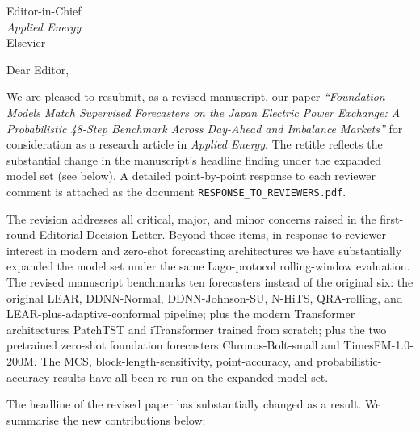 \documentclass[11pt,a4paper]{letter}
\begin{document}
\begin{letter}{Editor-in-Chief \\ \emph{Applied Energy} \\ Elsevier}

\opening{Dear Editor,}

We are pleased to resubmit, as a revised manuscript, our paper \emph{``Foundation Models Match Supervised Forecasters on the Japan Electric Power Exchange: A Probabilistic 48-Step Benchmark Across Day-Ahead and Imbalance Markets''} for consideration as a research article in \emph{Applied Energy}. The retitle reflects the substantial change in the manuscript's headline finding under the expanded model set (see below). A detailed point-by-point response to each reviewer comment is attached as the document \texttt{RESPONSE\_TO\_REVIEWERS.pdf}.

The revision addresses all critical, major, and minor concerns raised in the first-round Editorial Decision Letter. Beyond those items, in response to reviewer interest in modern and zero-shot forecasting architectures we have substantially expanded the model set under the same Lago-protocol rolling-window evaluation. The revised manuscript benchmarks ten forecasters instead of the original six: the original LEAR, DDNN-Normal, DDNN-Johnson-SU, N-HiTS, QRA-rolling, and LEAR-plus-adaptive-conformal pipeline; plus the modern Transformer architectures PatchTST and iTransformer trained from scratch; plus the two pretrained zero-shot foundation forecasters Chronos-Bolt-small and TimesFM-1.0-200M. The MCS, block-length-sensitivity, point-accuracy, and probabilistic-accuracy results have all been re-run on the expanded model set.

The headline of the revised paper has substantially changed as a result. We summarise the new contributions below:


\end{letter}
\end{document}
